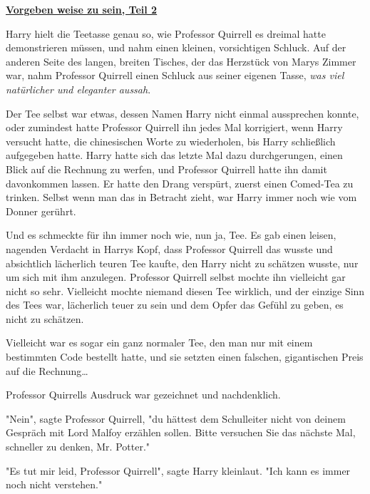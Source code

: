 

\hypertarget{vorgeben-weise-zu-sein-teil-2}{%

\textbf{\uline{Vorgeben weise zu sein, Teil 2}}

Harry hielt die Teetasse genau so, wie Professor Quirrell es dreimal hatte demonstrieren müssen, und nahm einen kleinen, vorsichtigen Schluck. Auf der anderen Seite des langen, breiten Tisches, der das Herzstück von Marys Zimmer war, nahm Professor Quirrell einen Schluck aus seiner eigenen Tasse, \emph{was viel natürlicher und eleganter aussah}.

Der Tee selbst war etwas, dessen Namen Harry nicht einmal aussprechen konnte, oder zumindest hatte Professor Quirrell ihn jedes Mal korrigiert, wenn Harry versucht hatte, die chinesischen Worte zu wiederholen, bis Harry schließlich aufgegeben hatte. Harry hatte sich das letzte Mal dazu durchgerungen, einen Blick auf die Rechnung zu werfen, und Professor Quirrell hatte ihn damit davonkommen lassen. Er hatte den Drang verspürt, zuerst einen Comed-Tea zu trinken. Selbst wenn man das in Betracht zieht, war Harry immer noch wie vom Donner gerührt.

Und es schmeckte für ihn immer noch wie, nun ja, Tee. Es gab einen leisen, nagenden Verdacht in Harrys Kopf, dass Professor Quirrell das wusste und absichtlich lächerlich teuren Tee kaufte, den Harry nicht zu schätzen wusste, nur um sich mit ihm anzulegen. Professor Quirrell selbst mochte ihn vielleicht gar nicht so sehr. Vielleicht mochte niemand diesen Tee wirklich, und der einzige Sinn des Tees war, lächerlich teuer zu sein und dem Opfer das Gefühl zu geben, es nicht zu schätzen.

Vielleicht war es sogar ein ganz normaler Tee, den man nur mit einem bestimmten Code bestellt hatte, und sie setzten einen falschen, gigantischen Preis auf die Rechnung…

Professor Quirrells Ausdruck war gezeichnet und nachdenklich.

"Nein", sagte Professor Quirrell, "du hättest dem Schulleiter nicht von deinem Gespräch mit Lord Malfoy erzählen sollen. Bitte versuchen Sie das nächste Mal, schneller zu denken, Mr. Potter."

"Es tut mir leid, Professor Quirrell", sagte Harry kleinlaut. "Ich kann es immer noch nicht verstehen."

}
